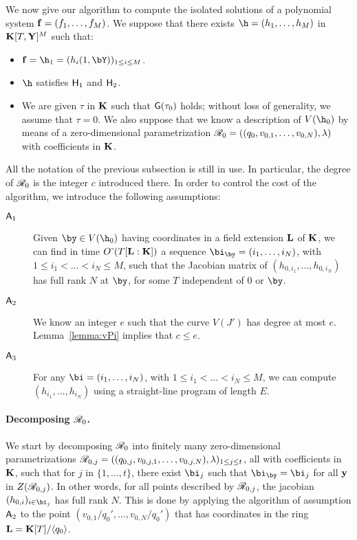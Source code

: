 \documentclass[12pt]{article}
\begin{document}
We now give our algorithm to compute the isolated solutions of a
polynomial system $\mathbf{f}=(f_1,\dots,f_M)$. We suppose that there exists
$\h=(h_1,\dots,h_M)$ in $\mathbf{K}[T,\mathbf{Y}]^M$ such that:
\begin{itemize}
\item $\f=\h_1=(h_i(1,\bY))_{1 \le i \le M}$.
\item $\h$ satisfies ${\sf H}_1$ and ${\sf H}_2$.
\item We are given $\tau$ in $\mathbf{K}$ such that ${\sf G}(\tau_0)$ holds;
  without loss of generality, we assume that $\tau=0$. We also 
  suppose that we know a description of $V(\h_{0})$ by means of a
  zero-dimensional parametrization
  $\mathscr{R}_{0}=((q_{0},v_{0,1},\dots,v_{0,N}),\lambda)$ with
  coefficients in $\mathbf{K}$. 
\end{itemize}
All the notation of the previous subsection is still in use. In
particular, the degree of $\mathscr{R}_{0}$ is the integer $c$ introduced
there. In order to control the cost of the algorithm, we introduce
the following assumptions:
\begin{description}
\item[${\sf A}_1$] Given $\by \in V(\h_0)$ having coordinates in a field
  extension $\mathbf{L}$ of $\mathbf{K}$, we can find in time $O\tilde{~}(T
  [\mathbf{L}:\mathbf{K}])$ a sequence $\bi_\by=(i_1,\dots,i_N)$, with
$1 \le i_1 < \dots < i_N \le M$, such that the
  Jacobian matrix of $(h_{0,i_1},\dots,h_{0,{i_N}})$ has full
  rank $N$ at $\by$, for some $T$ independent of $0$ or $\by$.
\item[${\sf A}_2$] We know an integer $e$ such that the curve $V(J')$
  has degree at most $e$. Lemma~\ref{lemma:vPi} implies that 
  $c \le e$.
\item[${\sf A}_3$] For any $\bi=(i_1,\dots,i_N)$, with $1 \le i_1 <
  \dots < i_N \le M$, we can compute $(h_{i_1},\dots,h_{{i_N}})$ using
  a straight-line program of length $E$.
\end{description}

\paragraph{Decomposing $\mathscr{R}_0$.}
We start by decomposing $\mathscr{R}_0$ into finitely many
zero-dimensional parametrizations
$\mathscr{R}_{0,j}=((q_{0,j},v_{0,j,1},\dots,v_{0,j,N}),\lambda)_{1\le
  j\le t}$, all with coefficients in $\mathbf{K}$, such that for $j$ in
$\{1,\dots,t\}$, there exist $\bi_j$ such that $\bi_\by=\bi_j$ for all
$\mathbf{y}$ in $Z(\mathscr{R}_{0,j})$. In other words, for all points described
by $\mathscr{R}_{0,j}$, the jacobian $(h_{0,i})_{i \in \bi_j}$ has
full rank $N$. This is done by applying the algorithm of assumption
${\sf A}_2$ to the point $(v_{0,1}/q_0',\dots,v_{0,N}/q_0')$ that has
coordinates in the ring $\mathbf{L}=\mathbf{K}[T]/\langle q_0 \rangle$.
\end{document}
